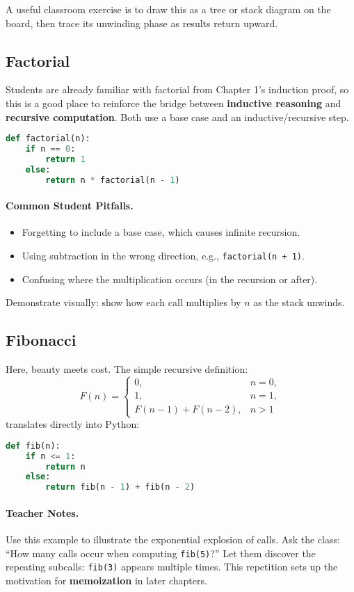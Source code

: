 A useful classroom exercise is to draw this as a tree or stack diagram on the board, 
then trace its unwinding phase as results return upward.

\subsection{Factorial}
Students are already familiar with factorial from Chapter 1’s induction proof, so this 
is a good place to reinforce the bridge between \textbf{inductive reasoning} and 
\textbf{recursive computation}. Both use a base case and an inductive/recursive step.

\begin{lstlisting}[language=Python]
def factorial(n):
    if n == 0:
        return 1
    else:
        return n * factorial(n - 1)
\end{lstlisting}

\paragraph{Common Student Pitfalls.}
\begin{itemize}
  \item Forgetting to include a base case, which causes infinite recursion.
  \item Using subtraction in the wrong direction, e.g., \texttt{factorial(n + 1)}.
  \item Confusing where the multiplication occurs (in the recursion or after).
\end{itemize}
Demonstrate visually: show how each call multiplies by $n$ as the stack unwinds.

\subsection{Fibonacci}
Here, beauty meets cost. The simple recursive definition:
\[
F(n) =
\begin{cases}
0, & n = 0,\\
1, & n = 1,\\
F(n-1) + F(n-2), & n > 1
\end{cases}
\]
translates directly into Python:
\begin{lstlisting}[language=Python]
def fib(n):
    if n <= 1:
        return n
    else:
        return fib(n - 1) + fib(n - 2)
\end{lstlisting}

\paragraph{Teacher Notes.}
Use this example to illustrate the exponential explosion of calls.
Ask the class: “How many calls occur when computing \texttt{fib(5)}?”
Let them discover the repeating subcalls: \texttt{fib(3)} appears multiple times.
This repetition sets up the motivation for \textbf{memoization} in later chapters.

